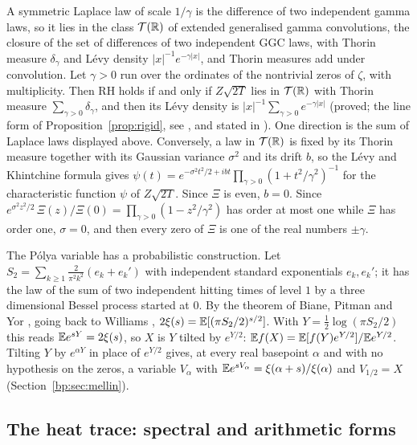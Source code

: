 \begin{remark}\label{xi:rem:eggc}
A symmetric Laplace law of scale $1/\gamma$ is the difference of two independent gamma laws, so it lies in the class $\mathcal T(\mathbb{R})$ of extended generalised gamma convolutions, the closure of the set of differences of two independent GGC laws, with Thorin measure $\delta_\gamma$ and L\'evy density $|x|^{-1}e^{-\gamma|x|}$, and Thorin measures add under convolution. Let $\gamma>0$ run over the ordinates of the nontrivial zeros of $\zeta$, with multiplicity. Then RH holds if and only if $Z\sqrt{2T}$ lies in $\mathcal T(\mathbb{R})$ with Thorin measure $\sum_{\gamma>0}\delta_\gamma$, and then its L\'evy density is $|x|^{-1}\sum_{\gamma>0}e^{-\gamma|x|}$ (proved; the line form of Proposition~\ref{prop:rigid}, see \cite{KPS24}, and stated in \cite{P18}). One direction is the sum of Laplace laws displayed above. Conversely, a law in $\mathcal T(\mathbb{R})$ is fixed by its Thorin measure together with its Gaussian variance $\sigma^2$ and its drift $b$, so the L\'evy and Khintchine formula gives $\psi(t)=e^{-\sigma^2t^2/2+ibt}\prod_{\gamma>0}(1+t^2/\gamma^2)^{-1}$ for the characteristic function $\psi$ of $Z\sqrt{2T}$. Since $\Xi$ is even, $b=0$. Since $e^{\sigma^2z^2/2}\,\Xi(z)/\Xi(0)=\prod_{\gamma>0}(1-z^2/\gamma^2)$ has order at most one while $\Xi$ has order one, $\sigma=0$, and then every zero of $\Xi$ is one of the real numbers $\pm\gamma$.
\end{remark}

The P\'olya variable has a probabilistic construction. Let $S_2=\sum_{k\ge1}\frac2{\pi^2k^2}(e_k+e_k')$ with independent standard exponentials $e_k,e_k'$; it has the law of the sum of two independent hitting times of level $1$ by a three dimensional Bessel process started at $0$. By the theorem of Biane, Pitman and Yor \cite{BPY01}, going back to Williams \cite{Williams90}, $2\xi(s)=\mathbb{E}[(\pi S_2/2)^{s/2}]$. With $Y=\frac12\log(\pi S_2/2)$ this reads $\mathbb{E} e^{sY}=2\xi(s)$, so $X$ is $Y$ tilted by $e^{Y/2}$: $\mathbb{E} f(X)=\mathbb{E}[f(Y)e^{Y/2}]/\mathbb{E} e^{Y/2}$. Tilting $Y$ by $e^{\alpha Y}$ in place of $e^{Y/2}$ gives, at every real basepoint $\alpha$ and with no hypothesis on the zeros, a variable $V_\alpha$ with $\mathbb{E} e^{sV_\alpha}=\xi(\alpha+s)/\xi(\alpha)$ and $V_{1/2}=X$ (Section~\ref{bp:sec:mellin}).

\subsection{The heat trace: spectral and arithmetic forms}

